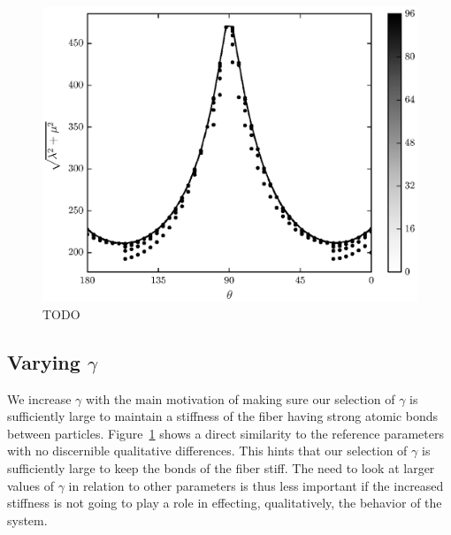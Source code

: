 	\begin{figure}
		\begin{center}
			\includegraphics{./fig/ch3/pull/g1000/grid.eps}
		\end{center}		
		\caption{ TODO
		\label{fig:PullGrid:g1000}}
	\end{figure}

\subsection{Varying $\gamma$}

We increase $\gamma$ with the main motivation of making sure our selection of $\gamma$ is sufficiently large to maintain a stiffness of the fiber having strong atomic bonds between particles. Figure~\ref{fig:PullGrid:g1000} shows a direct similarity to the reference parameters with no discernible qualitative differences. This hints that our selection of $\gamma$ is sufficiently large to keep the bonds of the fiber stiff. The need to look at larger values of $\gamma$ in relation to other parameters is thus less important if the increased stiffness is not going to play a role in effecting, qualitatively, the behavior of the system.

